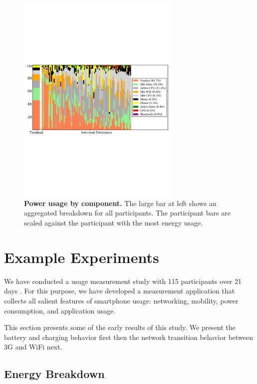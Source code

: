 
\begin{figure}[th!]
\centering
\includegraphics[width=0.7\textwidth]{./figures/power/breakdown/graph.pdf}
\caption{\textbf{Power usage by component.} The large bar at left shows an
aggregated breakdown for all participants. The participant bars are scaled
against the participant with the most energy usage.}
\label{figure-batteryoverview}
\end{figure}

\section{Example Experiments}
\label{sec-experiments}

We have conducted a usage measurement study with 115 participants over 21 days
.
For this purpose, we have developed a measurement application that collects all
salient features of smartphone usage: networking, mobility, power consumption,
and application usage.

This section presents some of the early results of this study. We present the
battery and charging behavior first then the network transition behavior
between 3G and WiFi next.

\subsection{Energy Breakdown}
\label{subsec-energybreakdown}

